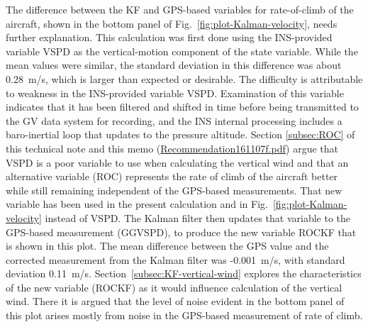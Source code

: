 \documentclass[12pt,twoside,english,12pt,twoside,english]{article}\usepackage[]{graphicx}\usepackage[]{color}
\let\OrgIndex\index
\renewcommand*{\index}[1]{\OrgIndex{#1}}
\begin{document}
The difference between the KF and GPS-based
variables for rate-of-climb of
the aircraft,
shown in the bottom panel of Fig.~\ref{fig:plot-Kalman-velocity},
needs further explanation. This calculation was first done using the
INS-provided variable VSPD
as the vertical-motion component of the state variable. While the
mean values were similar, the standard deviation
in this difference was about 0.28~m/s, which is larger than expected
or desirable. The difficulty is attributable to weakness in the INS-provided
variable VSPD\@. Examination of this
variable indicates that it has been filtered and shifted in time before
being transmitted to the GV data system for recording, and the INS
internal processing includes a baro-inertial
loop that updates to the pressure altitude.
Section \ref{subsec:ROC} of this technical note and this memo
(\href{https://drive.google.com/open?id=0B1kIUH45ca5AMXpaWlIyWWxwU2M}{Recommendation161107f.pdf})
argue that VSPD is a poor variable
to use when calculating the vertical wind
and that an alternative variable
(ROC) represents the rate of climb of the aircraft better while still
remaining independent of the GPS-based measurements. That new variable
has been used in the present calculation and in Fig.~\ref{fig:plot-Kalman-velocity}
 instead of VSPD. The Kalman filter then updates that variable to
the GPS-based measurement
(GGVSPD), to produce the new variable ROCKF
that is shown in this plot. The mean difference between the GPS value
and the corrected measurement from the Kalman filter
was -0.001~m/s, with standard deviation 0.11~m/s.
Section~\ref{subsec:KF-vertical-wind} explores the characteristics
of the new variable (ROCKF) as it would influence calculation
of the vertical wind. There it is argued that the level of noise evident
in the bottom panel of this plot arises mostly from noise in the GPS-based
measurement of rate of climb.
\end{document}
